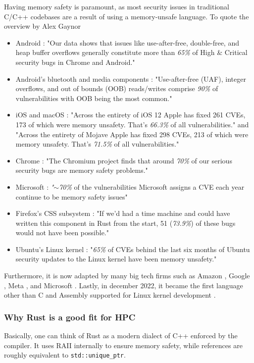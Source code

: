 Having memory safety is paramount, as most security issues in traditional C/C++ codebases are a result of using a memory-unsafe language. To quote the overview by Alex Gaynor \cite{gaynor}


\begin{itemize}
  \item Android \cite{androidmem}: "Our data shows that issues like use-after-free, double-free, and heap buffer overflows generally constitute more than \textit{65\%} of High \& Critical security bugs in Chrome and Android."
  \item Android’s bluetooth and media components \cite{androidmem2}: "Use-after-free (UAF), integer overflows, and out of bounds (OOB) reads/writes comprise \textit{90\%} of vulnerabilities with OOB being the most common."
  \item iOS and macOS \cite{iosmem}: "Across the entirety of iOS 12 Apple has fixed 261 CVEs, 173 of which were memory unsafety. That’s \textit{66.3\%} of all vulnerabilities." and "Across the entirety of Mojave Apple has fixed 298 CVEs, 213 of which were memory unsafety. That’s \textit{71.5\%} of all vulnerabilities."
  \item Chrome \cite{chromemem}: "The Chromium project finds that around \textit{70\%} of our serious security bugs are memory safety problems."
  \item Microsoft \cite{microsoftmem}: \textit{"$\sim$70\%} of the vulnerabilities Microsoft assigns a CVE each year continue to be memory safety issues"
  \item Firefox’s CSS subsystem \cite{ffmem}: "If we’d had a time machine and could have written this component in Rust from the start, 51 (\textit{73.9\%}) of these bugs would not have been possible."
  \item Ubuntu’s Linux kernel \cite{ubumem}: "\textit{65\%} of CVEs behind the last six months of Ubuntu security updates to the Linux kernel have been memory unsafety."
\end{itemize}

Furthermore, it is now adapted by many big tech firms such as Amazon \cite{awsrust}, Google \cite{googlerust}, Meta \cite{metarust}, and Microsoft \cite{msftrust}. Lastly, in december 2022, it became the first language other than C and Assembly supported for Linux kernel development \cite{linuxrust}.

\subsubsection{Why Rust is a good fit for HPC}
Basically, one can think of Rust as a modern dialect of C++ enforced by the compiler. It uses \ac{RAII} internally to ensure memory safety, while references are roughly equivalent to \texttt{std::unique\_ptr}.\\

